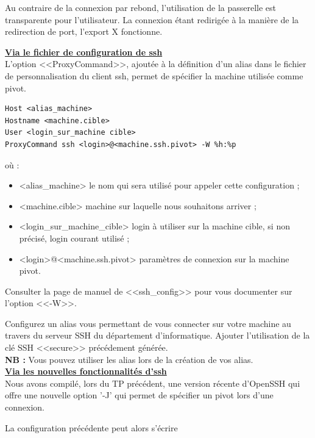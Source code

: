 \documentclass[11pt]{article}
\begin{document}
Au contraire de la connexion par rebond, l'utilisation de la passerelle est transparente pour l'utilisateur. La connexion étant redirigée à la manière de la redirection de port, l'export X fonctionne.

\noindent\textbf{\underline{Via le fichier de configuration de ssh}}\\

L'option <<ProxyCommand>>, ajoutée à la définition d'un alias dans le fichier de personnalisation du client ssh, permet de spécifier la machine utilisée comme pivot.

\begin{lstlisting}
Host <alias_machine>
Hostname <machine.cible>
User <login_sur_machine cible>
ProxyCommand ssh <login>@<machine.ssh.pivot> -W %h:%p
\end{lstlisting}

où :
\begin{itemize}
 \item{<alias\_machine>} le nom qui sera utilisé pour appeler cette configuration ;
 \item{<machine.cible>} machine sur laquelle nous souhaitons arriver ;
 \item{<login\_sur\_machine\_cible>} login à utiliser sur la machine cible, si non précisé, login courant utilisé ;
 \item{<login>@<machine.ssh.pivot>} paramètres de connexion sur la machine pivot.\\
\end{itemize}

Consulter la page de manuel de <<ssh\_config>> pour vous documenter sur l'option <<-W>>.

Configurez un alias vous permettant de vous connecter sur votre machine au travers du serveur SSH du département d'informatique.
Ajouter l'utilisation de la clé SSH <<secure>> précédement générée.\\

\textbf{NB :} Vous pouvez utiliser les alias lors de la création de vos alias.\\

\noindent\textbf{\underline{Via les nouvelles fonctionnalités d'ssh}}\\

Nous avons compilé, lors du TP précédent, une version récente d'OpenSSH qui offre une nouvelle option '-J' qui permet de spécifier un pivot lors d'une connexion.

La configuration précédente peut alors s'écrire
\end{document}
